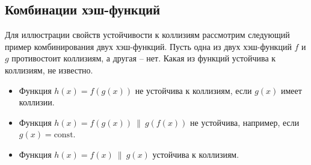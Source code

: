 \subsection{Комбинации хэш-функций}

Для иллюстрации свойств устойчивости к коллизиям рассмотрим следующий пример комбинирования двух хэш-функций. Пусть одна из двух хэш-функций $f$ и $g$ противостоит коллизиям, а другая -- нет. Какая из функций устойчива к коллизиям, не известно.
\begin{itemize}
    \item Функция $h(x) = f(g(x))$ не устойчива к коллизиям, если $g(x)$ имеет коллизии.
    \item Функция $h(x) = f(g(x)) ~\|~ g(f(x))$ не устойчива, например, если $g(x) = \textrm{const}$.
    \item Функция $h(x) = f(x) ~\|~ g(x)$ устойчива к коллизиям.
\end{itemize}
